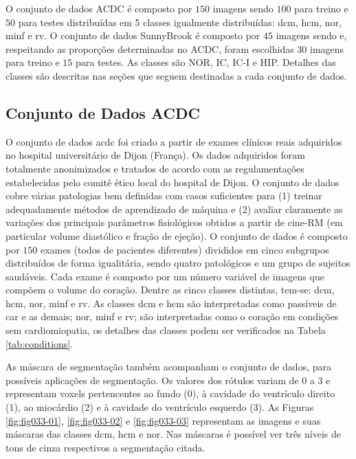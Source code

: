 O conjunto de dados ACDC é composto por $150$ imagens sendo $100$ para treino e $50$ para testes distribuídas em 5 classes igualmente distribuídas: \gls{dcm}, \gls{hcm}, \gls{nor}, \gls{minf} e \gls{rv}. O conjunto de dados SunnyBrook é composto por $45$ imagens sendo e, respeitando as proporções determinadas no ACDC, foram escolhidas $30$ imagens para treino e $15$ para testes. As classes são NOR, IC, IC-I e HIP. Detalhes das classes são descritas nas seções que seguem destinadas a cada conjunto de dados.

\subsection{Conjunto de Dados ACDC} 
\label{subsec:cap4_acdc}

O conjunto de dados \gls{acdc} foi criado a partir de exames clínicos reais adquiridos no hospital universitário de Dijon (França). Os dados adquiridos foram totalmente anonimizados e tratados de acordo com as regulamentações estabelecidas pelo comitê ético local do hospital de Dijon. O conjunto de dados cobre várias patologias bem definidas com casos suficientes para (1) treinar adequadamente métodos de aprendizado de máquina e (2) avaliar claramente as variações dos principais parâmetros fisiológicos obtidos a partir de cine-RM (em particular volume diastólico e fração de ejeção). O conjunto de dados é composto por $150$ exames (todos de pacientes diferentes) divididos em cinco subgrupos distribuídos de forma igualitária, sendo quatro patológicos e um grupo de sujeitos saudáveis. Cada exame é composto por um número variável de imagens que compõem o volume do coração. Dentre as cinco classes distintas, tem-se: \gls{dcm}, \gls{hcm}, \gls{nor}, \gls{minf} e \gls{rv}. As classes \gls{dcm} e \gls{hcm} são interpretadas como passíveis de \gls{car} e as demais; \gls{nor}, \gls{minf} e \gls{rv}; são interpretadas como o coração em condições sem cardiomiopatia, os detalhes das classes podem ser verificados na Tabela \ref{tab:conditions}. 

As máscara de segmentação também acompanham o conjunto de dados, para possíveis aplicações de segmentação. Os valores dos rótulos variam de $0$ a $3$ e representam voxels pertencentes ao fundo (0), à cavidade do ventrículo direito (1), ao miocárdio (2) e à cavidade do ventrículo esquerdo (3). As Figuras \ref{fig:fig033-01}, \ref{fig:fig033-02} e \ref{fig:fig033-03} representam as imagens e suas máscaras das classes \gls{dcm}, \gls{hcm} e \gls{nor}. Nas máscaras é possível ver três níveis de tons de cinza respectivos a segmentação citada.

